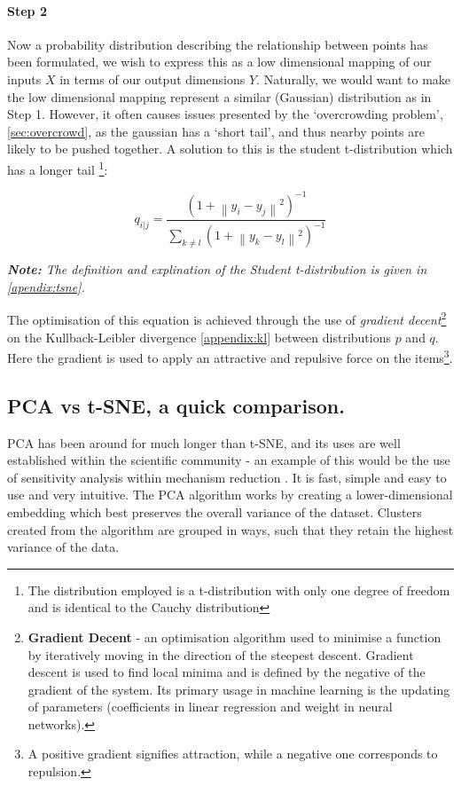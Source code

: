 \paragraph{Step 2}
Now a probability distribution describing the relationship between points has been formulated, we wish to express this as a low dimensional mapping of our inputs $X$ in terms of our output dimensions $Y$. Naturally, we would want to make the low dimensional mapping represent a similar (Gaussian) distribution as in Step 1. However, it often causes issues presented by the `overcrowding problem', \autoref{sec:overcrowd}, as the gaussian has a `short tail', and thus nearby points are likely to be pushed together. A solution to this is the student t-distribution which has a longer tail \footnote{The distribution employed is a t-distribution with only one degree of freedom and is identical to the Cauchy distribution}:

\begin{equation}
q_{i|j} =\frac{(1 + \left \| y_i - y_j \right \|^2 )^{-1}}{\sum_{k \neq l} (1 + \left \| y_k - y_l \right \|^2 )^{-1} }
\end{equation}

\emph{\textbf{Note:} The definition and explination of the Student t-distribution is given in \autoref{apendix:tsne}.
}

The optimisation of this equation is achieved through the use of \emph{gradient decent}\footnote{\textbf{Gradient Decent} - an optimisation algorithm used to minimise a function by iteratively moving in the direction of the steepest descent. Gradient descent is used to find local minima and is defined by the negative of the gradient of the system. Its primary usage in machine learning is the updating of parameters (coefficients in linear regression and weight in neural networks).}
 on the Kullback-Leibler divergence \autoref{appendix:kl} between distributions $p$ and $q$. Here the gradient is used to apply an attractive and repulsive force on the items\footnote{A positive gradient signifies attraction, while a negative one corresponds to repulsion.}.




\subsection{PCA vs t-SNE, a quick comparison.}

PCA has been around for much longer than t-SNE, and its uses are well established within the scientific community - an example of this would be the use of sensitivity analysis within mechanism reduction \citep{kinetics}. It is fast, simple and easy to use and very intuitive. The PCA algorithm works by creating a lower-dimensional embedding which best preserves the overall variance of the dataset. Clusters created from the algorithm are grouped in ways, such that they retain the highest variance of the data.

